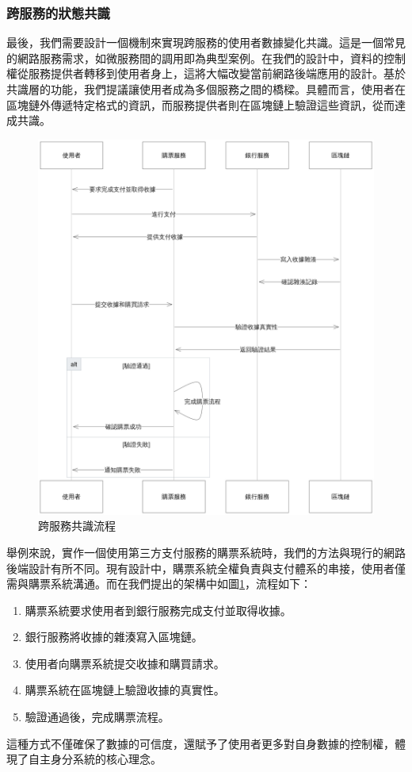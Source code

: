 \subsubsection{跨服務的狀態共識}
最後，我們需要設計一個機制來實現跨服務的使用者數據變化共識。這是一個常見的網路服務需求，如微服務間的調用即為典型案例。在我們的設計中，資料的控制權從服務提供者轉移到使用者身上，這將大幅改變當前網路後端應用的設計。基於共識層的功能，我們提議讓使用者成為多個服務之間的橋樑。具體而言，使用者在區塊鏈外傳遞特定格式的資訊，而服務提供者則在區塊鏈上驗證這些資訊，從而達成共識。
\begin{figure}
  \centering
  \includegraphics[width=\linewidth,keepaspectratio]{figures/flow-3-part.png}
  \caption{跨服務共識流程}
  \label{fig:flow-3-part}
\end{figure}
舉例來說，實作一個使用第三方支付服務的購票系統時，我們的方法與現行的網路後端設計有所不同。現有設計中，購票系統全權負責與支付體系的串接，使用者僅需與購票系統溝通。而在我們提出的架構中如圖\ref{fig:flow-3-part}，流程如下：
\begin{enumerate}
  \item 購票系統要求使用者到銀行服務完成支付並取得收據。
  \item 銀行服務將收據的雜湊寫入區塊鏈。
  \item 使用者向購票系統提交收據和購買請求。
  \item 購票系統在區塊鏈上驗證收據的真實性。
  \item 驗證通過後，完成購票流程。
\end{enumerate}
這種方式不僅確保了數據的可信度，還賦予了使用者更多對自身數據的控制權，體現了自主身分系統的核心理念。
